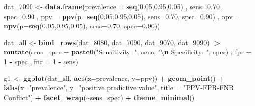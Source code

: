 \documentclass[12pt, twoside]{amherstthesis}
\newenvironment{Shaded}{\begin{snugshade}}{\end{snugshade}}
\newcommand{\AttributeTok}[1]{\textcolor[rgb]{0.13,0.29,0.53}{#1}}
\newcommand{\DecValTok}[1]{\textcolor[rgb]{0.00,0.00,0.81}{#1}}
\newcommand{\FloatTok}[1]{\textcolor[rgb]{0.00,0.00,0.81}{#1}}
\newcommand{\FunctionTok}[1]{\textcolor[rgb]{0.13,0.29,0.53}{\textbf{#1}}}
\newcommand{\NormalTok}[1]{#1}
\newcommand{\OtherTok}[1]{\textcolor[rgb]{0.56,0.35,0.01}{#1}}
\newcommand{\SpecialCharTok}[1]{\textcolor[rgb]{0.81,0.36,0.00}{\textbf{#1}}}
\newcommand{\StringTok}[1]{\textcolor[rgb]{0.31,0.60,0.02}{#1}}
\begin{document}
\begin{Shaded}
\begin{Highlighting}[]
\NormalTok{dat\_7090 }\OtherTok{\textless{}{-}} \FunctionTok{data.frame}\NormalTok{(}\AttributeTok{prevalence =} \FunctionTok{seq}\NormalTok{(}\FloatTok{0.05}\NormalTok{,}\FloatTok{0.95}\NormalTok{,}\FloatTok{0.05}\NormalTok{)}
\NormalTok{                       , }\AttributeTok{sens=}\FloatTok{0.70}
\NormalTok{                       , }\AttributeTok{spec=}\FloatTok{0.90}
\NormalTok{                       , }\AttributeTok{ppv =} \FunctionTok{ppv}\NormalTok{(}\AttributeTok{p=}\FunctionTok{seq}\NormalTok{(}\FloatTok{0.05}\NormalTok{,}\FloatTok{0.95}\NormalTok{,}\FloatTok{0.05}\NormalTok{), }
                                   \AttributeTok{sens=}\FloatTok{0.70}\NormalTok{, }
                                   \AttributeTok{spec=}\FloatTok{0.90}\NormalTok{)}
\NormalTok{                       , }\AttributeTok{npv =} \FunctionTok{npv}\NormalTok{(}\AttributeTok{p=}\FunctionTok{seq}\NormalTok{(}\FloatTok{0.05}\NormalTok{,}\FloatTok{0.95}\NormalTok{,}\FloatTok{0.05}\NormalTok{), }
                                   \AttributeTok{sens=}\FloatTok{0.70}\NormalTok{, }
                                   \AttributeTok{spec=}\FloatTok{0.90}\NormalTok{))}

\NormalTok{dat\_all }\OtherTok{\textless{}{-}} \FunctionTok{bind\_rows}\NormalTok{(dat\_8080, dat\_7090, dat\_9070, dat\_9090) }\SpecialCharTok{|\textgreater{}}
  \FunctionTok{mutate}\NormalTok{(}\AttributeTok{sens\_spec =} \FunctionTok{paste0}\NormalTok{(}\StringTok{"Sensitivity: "}\NormalTok{, sens, }
                            \StringTok{"}\SpecialCharTok{\textbackslash{}n}\StringTok{ Specificity: "}\NormalTok{, spec)}
\NormalTok{         , }\AttributeTok{fpr =} \DecValTok{1} \SpecialCharTok{{-}}\NormalTok{ spec}
\NormalTok{         , }\AttributeTok{fnr =} \DecValTok{1} \SpecialCharTok{{-}}\NormalTok{ sens)}

\NormalTok{g1 }\OtherTok{\textless{}{-}} \FunctionTok{ggplot}\NormalTok{(dat\_all, }\FunctionTok{aes}\NormalTok{(}\AttributeTok{x=}\NormalTok{prevalence, }\AttributeTok{y=}\NormalTok{ppv)) }\SpecialCharTok{+}
        \FunctionTok{geom\_point}\NormalTok{() }\SpecialCharTok{+} 
        \FunctionTok{labs}\NormalTok{(}\AttributeTok{x=}\StringTok{"prevalence"}\NormalTok{, }\AttributeTok{y=}\StringTok{"positive predictive value"}\NormalTok{,}
             \AttributeTok{title =} \StringTok{"PPV{-}FPR{-}FNR Conflict"}\NormalTok{) }\SpecialCharTok{+}
        \FunctionTok{facet\_wrap}\NormalTok{(}\SpecialCharTok{\textasciitilde{}}\NormalTok{sens\_spec) }\SpecialCharTok{+}
  \FunctionTok{theme\_minimal}\NormalTok{()}
 

\end{Highlighting}
\end{Shaded}
\end{document}
